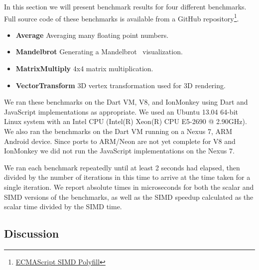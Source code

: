 \documentclass[preprint]{sigplanconf}
\begin{document}
In this section we will present benchmark results for four different benchmarks.
%
Full source code of these benchmarks is available from a GitHub
repository\footnote{\href{https://github.com/johnmccut
chan/ecmascript_simd/}{ECMAScript SIMD Polyfill}}.

\begin{itemize}

\item
\textbf{Average} Averaging many floating point numbers.

\item
\textbf{Mandelbrot} Generating a Mandelbrot~\cite{mandelbrot} visualization.

\item
\textbf{MatrixMultiply} 4x4 matrix multiplication.

\item
\textbf{VectorTransform} 3D vertex transformation used for 3D rendering.
\end{itemize}


We ran these benchmarks on the Dart VM, V8, and IonMonkey using Dart and
JavaScript implementations as appropriate.
%
We used an Ubuntu 13.04 64-bit Linux system with an Intel CPU
(Intel(R) Xeon(R) CPU E5-2690 @ 2.90GHz).
%
We also ran the benchmarks on the Dart VM running on a Nexus 7, ARM Android
device.
%
Since ports to ARM/Neon are not yet complete for V8 and IonMonkey we did not
run the JavaScript implementations on the Nexus 7.


We ran each benchmark repeatedly until at least 2 seconds had elapsed, then
divided by the number of iterations in this time to arrive at the time taken
for a single iteration.
%
We report absolute times in microseconds for both the scalar and SIMD versions
of the benchmarks, as well as the SIMD speedup calculated as the scalar time
divided by the SIMD time.


\subsection{Discussion}
\end{document}
